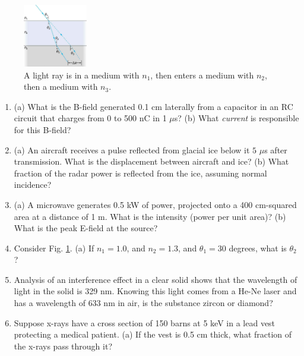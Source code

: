 \documentclass[12pt,twocolumn]{article}
\begin{document}
\begin{figure}
\centering
\includegraphics[width=0.25\textwidth]{lens_1.jpeg}
\caption{\label{fig:lens_1} \small A light ray is in a medium with $n_1$, then enters a medium with $n_2$, then a medium with $n_3$.}
\end{figure}

\noindent
\begin{enumerate}
\item (a) What is the B-field generated 0.1 cm laterally from a capacitor in an RC circuit that charges from 0 to 500 nC in 1 $\mu$s? (b) What \textit{current} is responsible for this B-field? \\ \vspace{2cm}
\item (a) An aircraft receives a pulse reflected from glacial ice below it $5$ $\mu$s after transmission. What is the displacement between aircraft and ice? (b) What fraction of the radar power is reflected from the ice, assuming normal incidence? \\ \vspace{2.5cm}
\item (a) A microwave generates 0.5 kW of power, projected onto a 400 cm-squared area at a distance of 1 m.  What is the intensity (power per unit area)? (b) What is the peak E-field at the source? \\ \vspace{2.5cm}
\item Consider Fig. \ref{fig:lens_1}.  (a) If $n_1 = 1.0$, and $n_2 = 1.3$, and $\theta_1 = 30$ degrees, what is $\theta_2$? \\ \vspace{2cm}
\item Analysis of an interference effect in a clear solid shows that the wavelength of light in the solid is 329 nm. Knowing this light comes from a He-Ne laser and has a wavelength of 633 nm in air, is the substance zircon or diamond?  \\ \vspace{1cm}
\item Suppose x-rays have a cross section of 150 barns at 5 keV in a lead vest protecting a medical patient. (a) If the vest is 0.5 cm thick, what fraction of the x-rays pass through it? \\ \vspace{2cm}

\end{enumerate}
\end{document}
